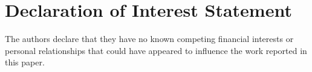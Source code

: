 \documentclass[12pt,a4paper]{article}
\begin{document}
\section*{Declaration of Interest Statement}

The authors declare that they have no known competing financial interests or personal relationships that could have appeared to influence the work reported in this paper.
\end{document}
